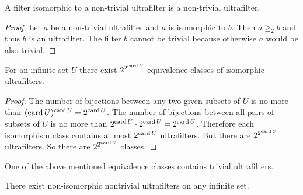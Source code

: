 \begin{prop}
A filter isomorphic to a non-trivial ultrafilter is a non-trivial
ultrafilter.\end{prop}
\begin{proof}
Let $a$ be a non-trivial ultrafilter and $a$ is isomorphic to $b$.
Then $a\ge_{2}b$ and thus $b$ is an ultrafilter. The filter $b$
cannot be trivial because otherwise $a$ would be also trivial.\end{proof}
\begin{thm}
For an infinite set $U$ there exist $2^{2^{\operatorname{card} U}}$ equivalence
classes of isomorphic ultrafilters.\end{thm}
\begin{proof}
The number of bijections between any two given subsets of $U$ is
no more than $(\operatorname{card} U)^{\operatorname{card} U}=2^{\operatorname{card} U}$. The number of bijections
between all pairs of subsets of $U$ is no more than $2^{\operatorname{card} U}\cdot2^{\operatorname{card} U}=2^{\operatorname{card} U}$.
Therefore each isomorphism class contains at most $2^{\operatorname{card} U}$ ultrafilters.
But there are $2^{2^{\operatorname{card} U}}$ ultrafilters. So there are $2^{2^{\operatorname{card} U}}$
classes.\end{proof}
\begin{rem}
One of the above mentioned equivalence classes contains trivial ultrafilters.\end{rem}
\begin{cor}
There exist non-isomorphic nontrivial ultrafilters on any infinite
set.
\end{cor}

